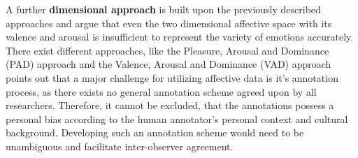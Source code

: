 \newline\newline
A further \textbf{dimensional approach} is built upon the previously described approaches and argue that even the two dimensional affective space with its valence and arousal is insufficient to represent the variety of emotions accurately. There exist different approaches, like the Pleasure, Arousal and Dominance (PAD) approach \citep{Gunes:2011:EmotionRepresentationContinuous} and the Valence, Arousal and Dominance (VAD) approach \citep{Verma:2017:3D-VAD}
\newline\newline
\citet{Gunes:2011:EmotionRepresentationContinuous} points out that a major challenge for utilizing affective data is it's annotation process, as there exists no general annotation scheme agreed upon by all researchers. Therefore, it cannot be excluded, that the annotations possess a personal bias according to the human annotator's personal context and cultural background. Developing such an annotation scheme would need to be unambiguous and facilitate inter-observer agreement.
